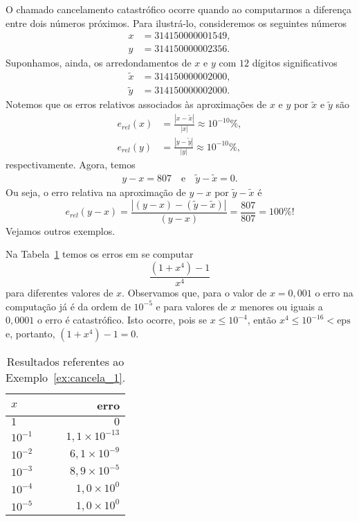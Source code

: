 O chamado cancelamento catastrófico ocorre quando ao computarmos a diferença entre dois números próximos. Para ilustrá-lo, consideremos os seguintes números
\begin{align}
  x &= 314150000001549,\\
  y &= 314150000002356.
\end{align}
Suponhamos, ainda, os arredondamentos de $x$ e $y$ com $12$ dígitos significativos
\begin{align}
  \tilde{x} &= 314150000002000,\\
  \tilde{y} &= 314150000002000.
\end{align}
Notemos que os erros relativos associados às aproximações de $x$ e $y$ por $\tilde{x}$ e $\tilde{y}$ são
\begin{align}
  e_{rel}(x) &= \frac{|x-\tilde{x}|}{|x|} \approx 10^{-10}\%,\\
  e_{rel}(y) &= \frac{|y-\tilde{y}|}{|y|} \approx 10^{-10}\%,
\end{align}
respectivamente. Agora, temos
\begin{align}
  y-x = 807\quad\text{e}\quad\tilde{y}-\tilde{x}=0.
\end{align}
Ou seja, o erro relativa na aproximação de $y-x$ por $\tilde{y}-\tilde{x}$ é
\begin{equation}
  e_{rel}(y-x) = \frac{|(y-x)-(\tilde{y}-\tilde{x})|}{(y-x)} = \frac{807}{807} = 100\%!
\end{equation}
Vejamos outros exemplos.

\begin{ex}\label{ex:cancela_1}
  Na Tabela~\ref{tab:cancela_1} temos os erros em se computar
  \begin{equation}
    \frac{(1+x^4)-1}{x^4}
  \end{equation}
para diferentes valores de $x$. Observamos que, para o valor de $x=0,001$ o erro na computação já é da ordem de $10^{-5}$ e para valores de $x$ menores ou iguais a $0,0001$ o erro é catastrófico. Isto ocorre, pois se $x\leq 10^{-4}$, então $x^4 \leq 10^{-16} < \mathrm{eps}$ e, portanto, $(1+x^4)-1=0$.
  \begin{table}[h!]
    \centering
    \begin{tabular}{l|r}
      $x$     & erro \\\hline
      $1$      & $0$ \\
      $10^{-1}$ & $1,1\times 10^{-13}$\\
      $10^{-2}$ & $6,1\times 10^{-9}$\\
      $10^{-3}$ & $8,9\times 10^{-5}$\\
      $10^{-4}$ & $1,0\times 10^{0}$\\
      $10^{-5}$ & $1,0\times 10^{0}$\\\hline
    \end{tabular}
    \caption{Resultados referentes ao Exemplo~\ref{ex:cancela_1}.}
    \label{tab:cancela_1}
  \end{table}
\end{ex}

